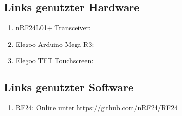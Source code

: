 \documentclass[a4paper, 11pt]{scrartcl}
\begin{document}
\subsection{Links genutzter Hardware}\label{ch:hardwarelinks}
\begin{enumerate}
    \item nRF24L01+ Transceiver: \url{}\label{itm:transceiverlink}
    \item Elegoo Arduino Mega R3: \url{}\label{itm:arduinolink}
    \item Elegoo TFT Touchscreen: \url{}\label{itm:tftlink}
\end{enumerate}

\subsection{Links genutzter Software}\label{ch:softwarelinks}
\begin{enumerate}
    \item RF24: Online unter \url{https://github.com/nRF24/RF24}\label{link:rf24}
\end{enumerate}
\end{document}
